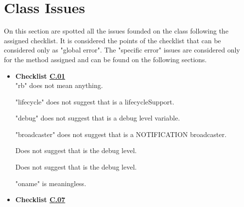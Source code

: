 \documentclass[../../../../codeInspection.tex]{subfiles}
\begin{document}
	\section{Class Issues}

		On this section are spotted all the issues founded on the class following the assigned checklist. It is considered the points of the checklist that can be considered only as "global error".
		The "specific error" issues are considered only for the method assigned and can be found on the following sections.

		\begin{itemize}

			\item \textbf{Checklist \hyperref[C:01]{C.01}} \\

				  

				  "rb" does not mean anything.

				  

				  "lifecycle" does not suggest that is a lifecycleSupport.

				  

				  "debug" does not suggest that is a debug level variable.

				  

				  "broadcaster" does not suggest that is a NOTIFICATION broadcaster.

				  

				  Does not suggest that is the debug level.

				  

				  Does not suggest that is the debug level.

				  

				  "oname" is meaningless.

		    \item \textbf{Checklist \hyperref[C:07]{C.07}}


\end{itemize}
\end{document}

